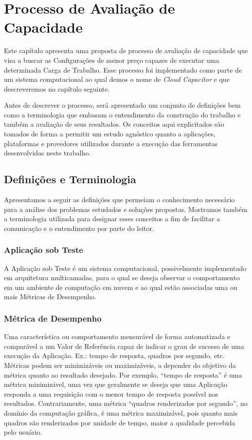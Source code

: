 \chapter{Processo de Avaliação de Capacidade}
\label{chap:processo}
Este capítulo apresenta uma proposta de processo de avaliação de capacidade
que visa a buscar as Configurações de menor preço capazes de executar uma determinada 
Carga de Trabalho. Esse processo foi implementado como parte de um sistema 
computacional ao qual demos o nome de \emph{Cloud Capacitor} e que descreveremos 
no capítulo seguinte.  

Antes de descrever o processo, será apresentado um 
conjunto de definições bem como a terminologia que embasam o entendimento da 
construção do trabalho e também a avaliação de seus resultados. Os conceitos aqui explicitados são tomados de 
forma a permitir um estudo agnóstico quanto a aplicações, plataformas e provedores
utilizados durante a execução das ferramentas desenvolvidas neste trabalho.

\section{Definições e Terminologia}
Apresentamos a seguir as definições que permeiam o conhecimento necessário para 
a análise dos problemas estudados e soluções propostas. Mostramos também a 
terminologia utilizada para designar esses conceitos a fim 
de facilitar a comunicação e o entendimento por parte do leitor.

\subsection{Aplicação sob Teste}
A Aplicação sob Teste é um sistema computacional, possivelmente implementado em 
arquitetura multicamadas, para o qual se deseja observar o comportamento em um 
ambiente de computação em nuvem e ao qual estão associadas uma ou mais Métricas de 
Desempenho.

\subsection{Métrica de Desempenho}
Uma característica ou comportamento mensurável de forma automatizada e 
comparável a um Valor de Referência capaz de indicar o grau de sucesso de uma 
execução da Aplicação. Ex.: tempo de resposta, quadros por segundo, etc. Métricas 
podem ser minimizáveis ou maximizáveis, a depender do objetivo da métrica quanto 
ao resultado desejado. Por exemplo, “tempo de resposta” é uma métrica 
minimizável, uma vez que geralmente se deseja que uma Aplicação responda a uma 
requisição com o menor tempo de resposta possível nos resultados. Contrariamente, 
uma métrica “quadros renderizados por segundo”, no domínio da computação gráfica, 
é uma métrica maximizável, pois quanto mais quadros são renderizados por unidade 
de tempo, maior a qualidade percebida pelo usuário.

